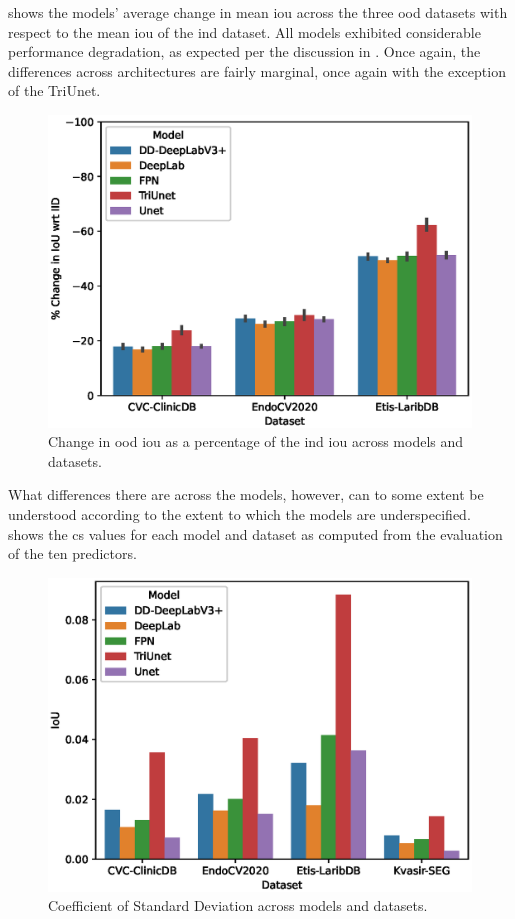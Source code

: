  shows the models' average change in mean \gls{iou} across the three \gls{ood} datasets with respect to the mean \gls{iou} of the \gls{ind} dataset. All models exhibited considerable performance degradation, as expected per the discussion in . Once again, the  differences across architectures are fairly marginal, once again with the exception of the TriUnet. 
    \begin{figure}[htb]
        \centering
        \includegraphics[width=\linewidth]{illustrations/delta_iou_baseline.eps}
        \caption{Change in \gls{ood} \gls{iou} as a percentage of the \gls{ind} \gls{iou} across models and datasets.}
        \label{fig:baseline_ious}
    \end{figure}

    What differences there are across the models, however, can to some extent be understood according to the extent to which the models are underspecified.~ shows the \gls{cs} values for each model and dataset as computed from the evaluation of the ten predictors. 
    
    \begin{figure}[htb]
        \centering
        \includegraphics[width=\linewidth]{illustrations/cstd_baseline.eps}
        \caption{Coefficient of Standard Deviation across models and datasets.}
        \label{fig:baseline_cstd}
    \end{figure}
    

